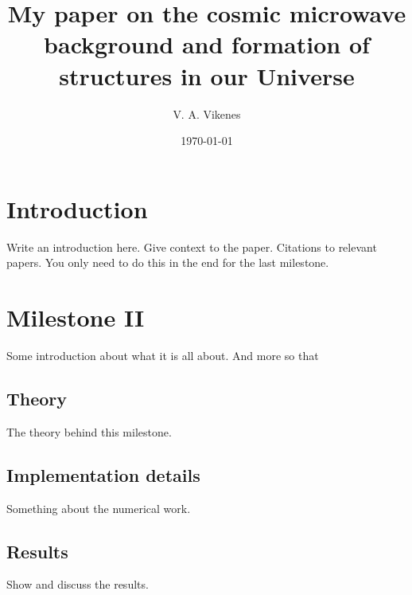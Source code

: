 

 

   \title{My paper on the cosmic microwave background and formation of structures in our Universe}

   \author{V. A. Vikenes}


   \date{\today}



   \maketitle

\section{Introduction}
Write an introduction here. Give context to the paper. Citations to relevant papers. You only need to do this in the end for the last milestone.





\section{Milestone II} 
Some introduction about what it is all about. And more so that 


\subsection{Theory}
The theory behind this milestone.

\subsection{Implementation details}
Something about the numerical work.

\subsection{Results}
Show and discuss the results.

